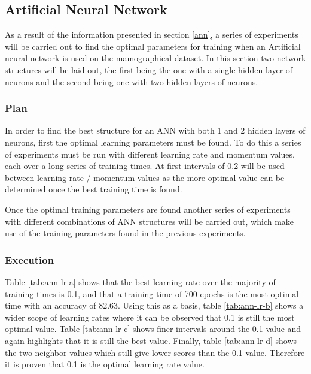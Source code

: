 \documentclass[12pt]{article}
\begin{document}
  \subsection{Artificial Neural Network}
    As a result of the information presented in section \ref{ann}, a series of experiments will be carried out to find the optimal parameters for training when an Artificial neural network is used on the mamographical dataset. In this section two network structures will be laid out, the first being the one with a single hidden layer of neurons and the second being one with two hidden layers of neurons.

    \subsubsection{Plan}
      In order to find the best structure for an ANN with both 1 and 2 hidden layers of neurons, first the optimal learning parameters must be found. To do this a series of experiments must be run with different learning rate and momentum values, each over a long series of training times. At first intervals of 0.2 will be used between learning rate / momentum values as the more optimal value can be determined once the best training time is found.

      Once the optimal training parameters are found another series of experiments with different combinations of ANN structures will be carried out, which make use of the training parameters found in the previous experiments.

    \subsubsection{Execution}
      Table \ref{tab:ann-lr-a} shows that the best learning rate over the majority of training times is 0.1, and that a training time of 700 epochs is the most optimal time with an accuracy of 82.63. Using this as a basis, table \ref{tab:ann-lr-b} shows a wider scope of learning rates where it can be observed that 0.1 is still the most optimal value. Table \ref{tab:ann-lr-c} shows finer intervals around the 0.1 value and again highlights that it is still the best value. Finally, table \ref{tab:ann-lr-d} shows the two neighbor values which still give lower scores than the 0.1 value. Therefore it is proven that 0.1 is the optimal learning rate value.
\end{document}

